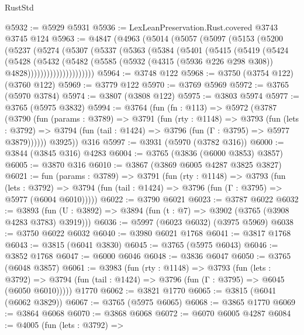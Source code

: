 \begin{lexlean}{RustStd}
\begin{coremodule}
@5932 := @5929 @5931
@5936 := LexLeanPreservation.Rust.covered @3743 @3745 @124
@5963 := @4847
    (@4963
      (@5014
        (@5057
          (@5097
            (@5153
              (@5200
                (@5237
                  (@5274
                    (@5307
                      (@5337
                        (@5363
                          (@5384
                            (@5401
                              (@5415
                                (@5419
                                  (@5424
                                    (@5428
                                      (@5432
                                        (@5482
                                          (@5585
                                            (@5932
                                              (@4315 (@5936 @226 @298 @308))
                                              @4828)))))))))))))))))))))
@5964 := @3748 @122
@5968 := @3750 (@3754 @122) (@3760 @122)
@5969 := @3779 @122
@5970 := @3769 @5969
@5972 := @3765 (@5970 @3784)
@5974 := @3807 (@3808 @122)
@5975 := @3803 @5974
@5977 := @3765 (@5975 @3832)
@5994 := @3764
    (fun (fn : @113) =>
    @5972
      (@3787
        (@3790
          (fun (params : @3789) =>
          @3791
            (fun (rty : @1148) =>
            @3793
              (fun (lets : @3792) =>
              @3794 (fun (tail : @1424) => @3796 (fun (Γ : @3795) => @5977 @3879))))))
        @3925))
    @316
@5997 := @3931 (@5970 (@3782 @316))
@6000 := @3844 (@3845 @316) @4283
@6004 := @3765 (@3836 (@6000 @3853) @3857)
@6005 := @3870 @316
@6010 := @3867 (@3869 @6005 @4287 @3825 @3827)
@6021 := fun (params : @3789) =>
  @3791
    (fun (rty : @1148) =>
    @3793
      (fun (lets : @3792) =>
      @3794 (fun (tail : @1424) => @3796 (fun (Γ : @3795) => @5977 (@6004 @6010)))))
@6022 := @3790 @6021
@6023 := @3787 @6022
@6032 := @3893 (fun (U : @3892) => @3894 (fun (t : @7) => @3902 (@3765 (@3908 @4283 @3783) @3919)))
@6036 := @5997 (@6023 @6032) (@3975 @5969)
@6038 := @3750 @6022 @6032
@6040 := @3980 @6021 @1768
@6041 := @3817 @1768
@6043 := @3815 (@6041 @3830)
@6045 := @3765 (@5975 @6043)
@6046 := @3852 @1768
@6047 := @6000 @6046
@6048 := @3836 @6047
@6050 := @3765 (@6048 @3857)
@6061 := @3983
    (fun (rty : @1148) =>
    @3793
      (fun (lets : @3792) =>
      @3794 (fun (tail : @1424) => @3796 (fun (Γ : @3795) => @6045 (@6050 @6010)))))
    @1770
@6062 := @3821 @1770
@6065 := @3815 (@6041 (@6062 @3829))
@6067 := @3765 (@5975 @6065)
@6068 := @3865 @1770
@6069 := @3864 @6068
@6070 := @3868 @6068
@6072 := @6070 @6005 @4287
@6084 := @4005
    (fun (lets : @3792) =>

\end{coremodule}
\end{lexlean}

